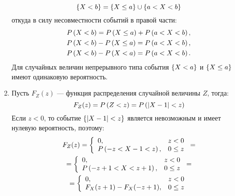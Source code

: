\documentclass[12pt,a4paper]{article}
\begin{document}
\begin{enumerate}
        \begin{equation}
            \left \{ X < b \right \} = \left \{ X \leq a \right \} \cup \left \{ a < X < b \right \}
        \end{equation}
        откуда в силу несовместности событий в правой части:
        \begin{gather}
            P \left ( X < b \right ) = P \left ( X \leq a \right ) + P \left ( a < X < b \right ) , \\
            P \left ( X < b \right ) - P \left ( X \leq a \right ) = P \left ( a < X < b \right ) , \\
            P \left ( X < b \right ) - P \left ( X < a \right ) = P \left ( a < X < b \right ) .
        \end{gather}
        Для случайных величин непрерывного типа события $\left \{ X < a \right \}$ и $\left \{ X \leq a \right \}$ имеют одинаковую вероятность.

        \item Пусть $F_Z(z)$ --- функция распределения случайной величины $Z$, тогда:
        \begin{equation}
            F_Z(z) = P \left ( Z < z \right ) = P \left ( \left | X - 1 \right | < z \right )
        \end{equation}
        Если $z < 0$, то событие $\left \{ \left | X - 1 \right | < z \right \}$ является невозможным и имеет нулевую вероятность, поэтому:
        \begin{multline}
            F_Z(z)
            = \left \{
            \begin{array}{ll}
                0,                            & z < 0    \\
                P \left ( -z < X - 1 < z \right ), & 0 \leq z
            \end{array}
            \right . = \\
            = \left \{
            \begin{array}{ll}
                0,                                & z < 0    \\
                P \left ( -z + 1 < X < z + 1 \right ), & 0 \leq z
            \end{array}
            \right . = \\
            = \left \{
            \begin{array}{ll}
                0,                        & z < 0    \\
                F_X(z + 1) - F_X(-z + 1), & 0 \leq z
            \end{array}
            \right .
        \end{multline}


\end{enumerate}
\end{document}
